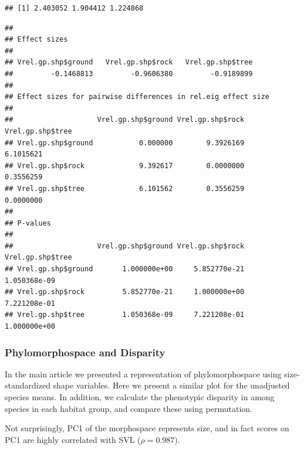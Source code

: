 \documentclass[
  11pt,
]{article}
\newenvironment{Shaded}{\begin{snugshade}}{\end{snugshade}}
\newcommand{\AttributeTok}[1]{\textcolor[rgb]{0.77,0.63,0.00}{#1}}
\newcommand{\DecValTok}[1]{\textcolor[rgb]{0.00,0.00,0.81}{#1}}
\newcommand{\FunctionTok}[1]{\textcolor[rgb]{0.00,0.00,0.00}{#1}}
\newcommand{\NormalTok}[1]{#1}
\newcommand{\OtherTok}[1]{\textcolor[rgb]{0.56,0.35,0.01}{#1}}
\newcommand{\SpecialCharTok}[1]{\textcolor[rgb]{0.00,0.00,0.00}{#1}}
\begin{document}
\begin{verbatim}
## [1] 2.403052 1.904412 1.224868
\end{verbatim}

\begin{Shaded}
\end{Shaded}

\begin{verbatim}
## 
## Effect sizes
## 
## Vrel.gp.shp$ground   Vrel.gp.shp$rock   Vrel.gp.shp$tree 
##         -0.1468813         -0.9606380         -0.9189899 
## 
## Effect sizes for pairwise differences in rel.eig effect size
## 
##                    Vrel.gp.shp$ground Vrel.gp.shp$rock Vrel.gp.shp$tree
## Vrel.gp.shp$ground           0.000000        9.3926169        6.1015621
## Vrel.gp.shp$rock             9.392617        0.0000000        0.3556259
## Vrel.gp.shp$tree             6.101562        0.3556259        0.0000000
## 
## P-values
## 
##                    Vrel.gp.shp$ground Vrel.gp.shp$rock Vrel.gp.shp$tree
## Vrel.gp.shp$ground       1.000000e+00     5.852770e-21     1.050368e-09
## Vrel.gp.shp$rock         5.852770e-21     1.000000e+00     7.221208e-01
## Vrel.gp.shp$tree         1.050368e-09     7.221208e-01     1.000000e+00
\end{verbatim}

\hypertarget{phylomorphospace-and-disparity}{%
\subsubsection{Phylomorphospace and
Disparity}\label{phylomorphospace-and-disparity}}

In the main article we presented a representation of phylomorphospace
using size-standardized shape variables. Here we present a similar plot
for the unadjusted species means. In addition, we calculate the
phenotypic disparity in among species in each habitat group, and compare
these using permutation.

Not surprisingly, PC1 of the morphospace represents size, and in fact
scores on PC1 are highly correlated with SVL (\(\rho=0.987\)).

\begin{Shaded}
\end{Shaded}
\end{document}
